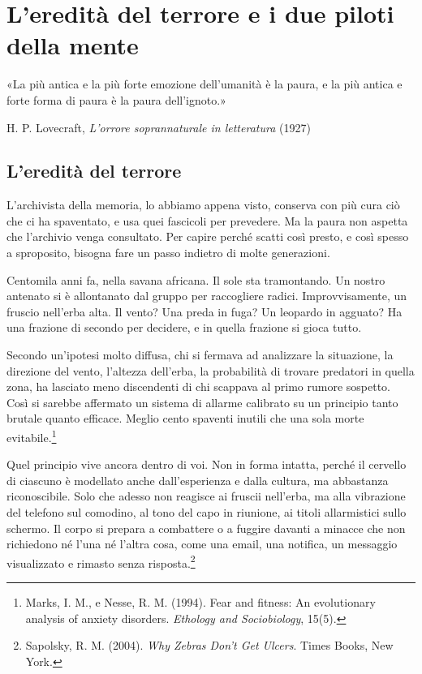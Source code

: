 \chapter{L'eredità del terrore e i due piloti della mente}
\label{cap:p1c2}

\epigraph{«La più antica e la più forte emozione dell'umanità è la paura, e la più antica e forte forma di paura è la paura dell'ignoto.»}{H. P. Lovecraft, \textit{L'orrore soprannaturale in letteratura} (1927)}

\section{L'eredità del terrore}
\label{sec:p1c2-eredita-terrore}

L'archivista della memoria, lo abbiamo appena visto, conserva con più cura ciò che ci ha spaventato, e usa quei fascicoli per prevedere. Ma la paura non aspetta che l'archivio venga consultato. Per capire perché scatti così presto, e così spesso a sproposito, bisogna fare un passo indietro di molte generazioni.

Centomila anni fa, nella savana africana. Il sole sta tramontando. Un nostro antenato si è allontanato dal gruppo per raccogliere radici. Improvvisamente, un fruscio nell'erba alta. Il vento? Una preda in fuga? Un leopardo in agguato? Ha una frazione di secondo per decidere, e in quella frazione si gioca tutto.

Secondo un'ipotesi molto diffusa, chi si fermava ad analizzare la situazione, la direzione del vento, l'altezza dell'erba, la probabilità di trovare predatori in quella zona, ha lasciato meno discendenti di chi scappava al primo rumore sospetto. Così si sarebbe affermato un sistema di allarme calibrato su un principio tanto brutale quanto efficace. Meglio cento spaventi inutili che una sola morte evitabile.\footnote{Marks, I. M., e Nesse, R. M. (1994). Fear and fitness: An evolutionary analysis of anxiety disorders. \textit{Ethology and Sociobiology}, 15(5).}

Quel principio vive ancora dentro di voi. Non in forma intatta, perché il cervello di ciascuno è modellato anche dall'esperienza e dalla cultura, ma abbastanza riconoscibile. Solo che adesso non reagisce ai fruscii nell'erba, ma alla vibrazione del telefono sul comodino, al tono del capo in riunione, ai titoli allarmistici sullo schermo. Il corpo si prepara a combattere o a fuggire davanti a minacce che non richiedono né l'una né l'altra cosa, come una email, una notifica, un messaggio visualizzato e rimasto senza risposta.\footnote{Sapolsky, R. M. (2004). \textit{Why Zebras Don't Get Ulcers}. Times Books, New York.}

